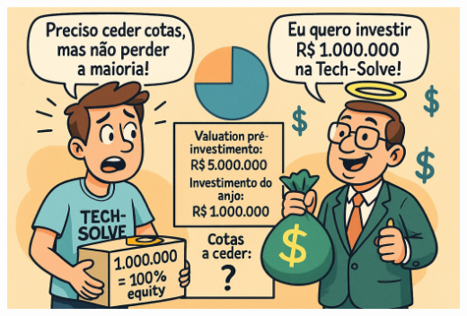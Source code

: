 \documentclass[
]{book}
\begin{document}
\includegraphics[width=10.6875in,height=\textheight]{images/03-2025-08-19_20/exercicio-01.jpg}
\end{document}
